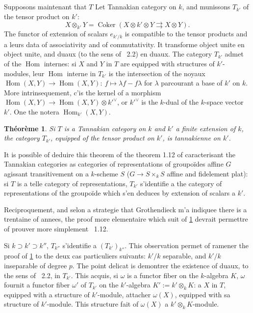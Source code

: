 \documentclass[11pt,a4paper]{article}
\theoremstyle{plain}
\newtheorem{theorem}{Th\'eor\`eme}[section]
\theoremstyle{definition}
\DeclareMathOperator{\Hom}{Hom}
\DeclareMathOperator{\Coker}{Coker}
\begin{document}
\subsection{}
Supposons maintenant that $T$ Let Tannakian category on $k$, and munissons $T_{k'}$ of the tensor product on $k'$:
\[
X \otimes_{k'} Y = \Coker(X \otimes k' \otimes Y \rightrightarrows X \otimes Y).
\]
The functor of extension of scalars $e_{k'/k}$ is compatible to the tensor products and a leurs data of associativity and of commutativity. It transforme object unite en object unite, and duaux (to the sens of \cite{Deligne1990}~2.2) en duaux. The category $T_{k'}$ admet of the $\Hom$ internes: si $X$ and $Y$ in $T$ are equipped with structures of $k'$-modules, leur $\Hom$ interne in $T_{k'}$ is the intersection of the noyaux $\Hom(X, Y) \to \Hom(X, Y):\ f \mapsto \lambda f - f \lambda$ for $\lambda$ parcourant a base of $k'$ on $k$. More intrinsequement, c'is the kernel of a morphism $\Hom(X, Y) \to \Hom(X, Y) \otimes k'^{\vee}$, or $k'^{\vee}$ is the $k$-dual of the $k$-space vector $k'$. One the notera $\Hom_{k'}(X, Y)$.

\begin{theorem}\label{thm:4.4}
Si $T$ is a Tannakian category on $k$ and $k'$ a finite extension of $k$, the category $T_{k'}$, equipped of the tensor product on $k'$, is tannakienne on $k'$.
\end{theorem}

It is possible of deduire this theorem of the theorem 1.12 of \cite{Deligne1990} caracterisant the Tannakian categories as categories of representations of groupo\"ides affine $G$ agissant transitivement on a $k$-scheme $S$ ($G \to S \times_k S$ affine and fidelement plat): si $T$ is a telle category of representations, $T_{k'}$ s'identifie a the category of representations of the groupo\"ide which s'en deduces by extension of scalars a $k'$.

Reciproquement, and selon a strategie that Grothendieck m'a indiquee there is a trentaine of annees, the proof more elementaire which suit of \ref{thm:4.4} devrait permettre of prouver more simplement \cite{Deligne1990}~1.12.

Si $k \supset k' \supset k''$, $T_{k''}$ s'identifie a $(T_{k'})_{k''}$. This observation permet of ramener the proof of \ref{thm:4.4} to the deux cas particuliers suivants: $k'/k$ separable, and $k'/k$ inseparable of degree $p$. The point delicat is demontrer the existence of duaux, to the sens of \cite{Deligne1990}~2.2, in $T_{k'}$. This acquis, si $\omega$ is a functor fiber on the $k$-algebra $K$, $\omega$ fournit a functor fiber $\omega'$ of $T_{k'}$ on the $k'$-algebra $K' := k' \otimes_k K$: a $X$ in $T$, equipped with a structure of $k'$-module, attacher $\omega(X)$, equipped with sa structure of $k'$-module. This structure fait of $\omega(X)$ a $k' \otimes_k K$-module.
\end{document}
